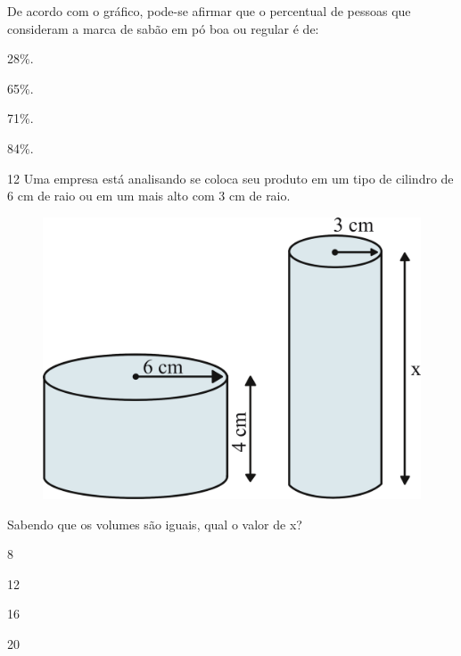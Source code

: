 
De acordo com o gráfico, pode-se afirmar que o percentual de pessoas que
consideram a marca de sabão em pó boa ou regular é de:

\begin{multicols}{2}
\begin{escolha}
\item 28\%.

\item 65\%.

\item 71\%.

\item 84\%.
\end{escolha}
\end{multicols}

\pagebreak
\num{12} Uma empresa está analisando se coloca seu produto em um tipo de
cilindro de 6 cm de raio ou em um mais alto com 3 cm de raio.

\begin{figure}[htpb!]
\centering
\includegraphics[width=\textwidth]{./ilustras-mat/Simulado_4-atividade_12.png}
\end{figure}

Sabendo que os volumes são iguais, qual o valor de x?

\begin{escolha}
\item
  8
\item
  12
\item
  16
\item
  20
\end{escolha}

